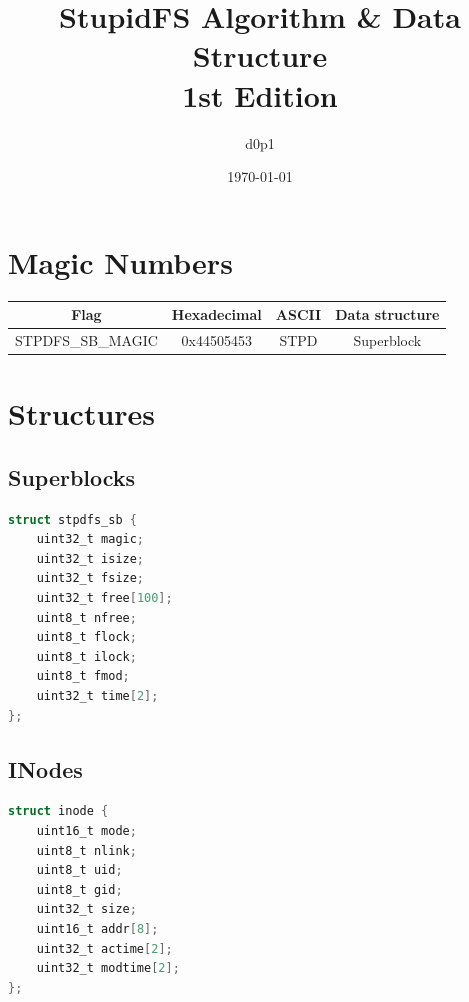 \documentclass[a4paper, 12pt, openright, english]{scrbook}
\date{\today}
\title{%
	StupidFS Algorithm \& Data Structure \\
	\large 1st Edition}
\author{d0p1}
\begin{document}
	\frontmatter
	
	\maketitle
	\tableofcontents

	\mainmatter

	\chapter{Magic Numbers}

	\begin{center}
		\begin{tabular}{ |c|c|c|c| } 
 			\hline
 			\textbf{Flag} & \textbf{Hexadecimal} & \textbf{ASCII} & \textbf{Data structure}  \\ 
			\hline
 			STPDFS\_SB\_MAGIC & 0x44505453 & STPD & Superblock \\ 
 			\hline
		\end{tabular}
	\end{center}

	\chapter{Structures}

	\section{Superblocks}

	\begin{lstlisting}[language=C]
struct stpdfs_sb {
	uint32_t magic;
	uint32_t isize;
	uint32_t fsize;
	uint32_t free[100];
	uint8_t nfree;
	uint8_t flock;
	uint8_t ilock;
	uint8_t fmod;
	uint32_t time[2];
};
	\end{lstlisting}

	\section{INodes}

	\begin{lstlisting}[language=C]
struct inode {
	uint16_t mode;
	uint8_t nlink;
	uint8_t uid;
	uint8_t gid;
	uint32_t size;
	uint16_t addr[8];
	uint32_t actime[2];
	uint32_t modtime[2];
};
	\end{lstlisting}
	\appendix
\end{document}
